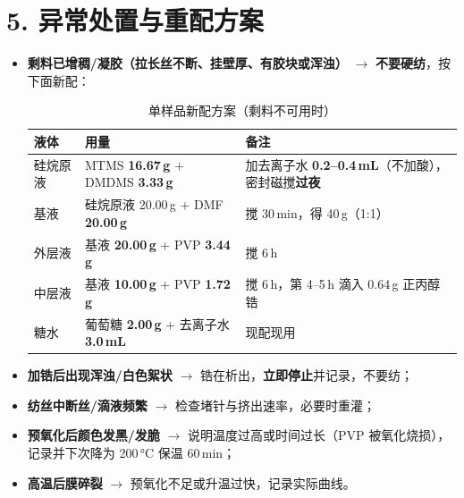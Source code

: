 \documentclass[a4paper, 11pt]{ctexart}
\begin{document}
\section*{5. 异常处置与重配方案}
\begin{itemize}
  \item \textbf{剩料已增稠/凝胶（拉长丝不断、挂壁厚、有胶块或浑浊）} $\rightarrow$ \textbf{不要硬纺}，按下面新配：
    \begin{table}[htbp]
    \centering
    \caption{单样品新配方案（剩料不可用时）}
    \begin{tabularx}{\textwidth}{l l X}
    \toprule
    液体 & 用量 & 备注 \\
    \midrule
    硅烷原液 & MTMS \textbf{16.67\,g} + DMDMS \textbf{3.33\,g} & 加去离子水 \textbf{0.2--0.4\,mL}（不加酸），密封磁搅\textbf{过夜} \\
    基液 & 硅烷原液 20.00\,g + DMF \textbf{20.00\,g} & 搅 30\,min，得 40\,g（1:1） \\
    外层液 & 基液 \textbf{20.00\,g} + PVP \textbf{3.44\,g} & 搅 6\,h \\
    中层液 & 基液 \textbf{10.00\,g} + PVP \textbf{1.72\,g} & 搅 6\,h，第 4--5\,h 滴入 0.64\,g 正丙醇锆 \\
    糖水 & 葡萄糖 \textbf{2.00\,g} + 去离子水 \textbf{3.0\,mL} & 现配现用 \\
    \bottomrule
    \end{tabularx}
    \end{table}
  \item \textbf{加锆后出现浑浊/白色絮状} $\rightarrow$ 锆在析出，\textbf{立即停止}并记录，不要纺；
  \item \textbf{纺丝中断丝/滴液频繁} $\rightarrow$ 检查堵针与挤出速率，必要时重灌；
  \item \textbf{预氧化后颜色发黑/发脆} $\rightarrow$ 说明温度过高或时间过长（PVP 被氧化烧损），记录并下次降为 200\,°C 保温 60\,min；
  \item \textbf{高温后膜碎裂} $\rightarrow$ 预氧化不足或升温过快，记录实际曲线。
\end{itemize}
\end{document}
